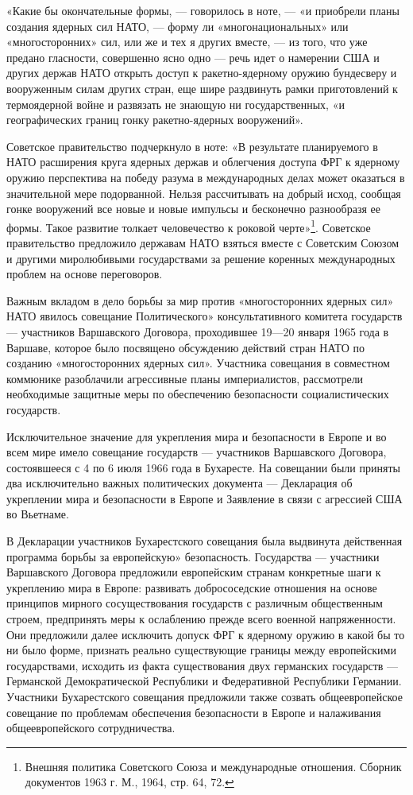 \documentclass[12pt, a4paper, openany]{book}
\begin{document}
	«Какие бы окончательные формы, — говорилось в ноте, — «и приобрели планы создания ядерных сил НАТО, — форму ли «многонациональных» или «многосторонних» сил, или же и тех я других вместе, — из того, что уже предано гласности, совершенно ясно одно — речь идет о намерении США и других держав НАТО открыть доступ к ракетно-ядерному оружию бундесверу и вооруженным силам других стран, еще шире раздвинуть рамки приготовлений к термоядерной войне и развязать не знающую ни государственных, «и географических границ гонку ракетно-ядерных вооружений».
	
	Советское правительство подчеркнуло в ноте: «В результате планируемого в НАТО расширения круга ядерных держав и облегчения доступа ФРГ к ядерному оружию перспектива на победу разума в международных делах может оказаться в значительной мере подорванной. Нельзя рассчитывать на добрый исход, сообщая гонке вооружений все новые и новые импульсы и бесконечно разнообразя ее формы. Такое развитие толкает человечество к роковой черте»{\footnote{Внешняя политика Советского Союза и международные отношения. Сборник документов 1963 г. М., 1964, стр. 64, 72.}}. Советское правительство предложило державам НАТО взяться вместе с Советским Союзом и другими миролюбивыми государствами за решение коренных международных проблем на основе переговоров.
	
	Важным вкладом в дело борьбы за мир против «многосторонних ядерных сил» НАТО явилось совещание Политического» консультативного комитета государств — участников Варшавского Договора, проходившее 19—20 января 1965 года в Варшаве, которое было посвящено обсуждению действий стран НАТО по созданию «многосторонних ядерных сил». Участника совещания в совместном коммюнике разоблачили агрессивные планы империалистов, рассмотрели необходимые защитные меры по обеспечению безопасности социалистических государств.
	
	Исключительное значение для укрепления мира и безопасности в Европе и во всем мире имело совещание государств — участников Варшавского Договора, состоявшееся с 4 по 6 июля 1966 года в Бухаресте. На совещании были приняты два исключительно важных политических документа — Декларация об укреплении мира и безопасности в Европе и Заявление в связи с агрессией США во Вьетнаме.
	
	В Декларации участников Бухарестского совещания была выдвинута действенная программа борьбы за европейскую» безопасность. Государства — участники Варшавского Договора предложили европейским странам конкретные шаги к укреплению мира в Европе: развивать добрососедские отношения на основе принципов мирного сосуществования государств с различным общественным строем, предпринять меры к ослаблению прежде всего военной напряженности. Они предложили далее исключить допуск ФРГ к ядерному оружию в какой бы то ни было форме, признать реально существующие границы между европейскими государствами, исходить из факта существования двух германских государств — Германской Демократической Республики и Федеративной Республики Германии. Участники Бухарестского совещания предложили также созвать общеевропейское совещание по проблемам обеспечения безопасности в Европе и налаживания общеевропейского сотрудничества.
	
\end{document}
